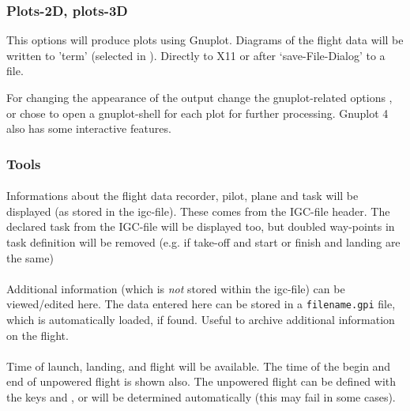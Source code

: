 \subsubsection{Plots-2D, plots-3D}
This options will produce plots using Gnuplot.
Diagrams of the flight data will be written to 'term' (selected in ).
Directly to X11 or after `save-File-Dialog' to a file.

For changing the appearance of the output change the gnuplot-related options , or chose to open
a gnuplot-shell for each plot for further processing.
Gnuplot 4 also has some interactive features.

\subsubsection{Tools}

\paragraph{
}
Informations about the flight data recorder, pilot, plane and task will be displayed (as stored in the igc-file).
These comes from the IGC-file header.
The declared task from the IGC-file will be displayed too, but doubled way-points in task definition will be removed
(e.g. if take-off and start or finish and landing are the same)

\paragraph{
}
\label{add_info}
Additional information (which is \emph{not} stored within the igc-file) can be viewed/edited here.
The data entered here can be stored in a \texttt{filename.gpi} file, which is automatically loaded, if found.
Useful to archive additional information on the flight.


\paragraph{
}
Time of launch, landing, and flight will be available.
The time of the begin and end of unpowered flight is shown also.
The unpowered flight can be defined with the keys  and , or will be determined automatically (this may fail in some cases).

